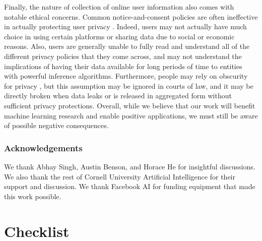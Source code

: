 \documentclass{article}
\begin{document}
Finally, the nature of collection of online user information also comes with notable ethical concerns. Common notice-and-consent policies are often ineffective in actually protecting user privacy \cite{Nissenbaum2011ACA}. Indeed, users may not actually have much choice in using certain platforms or sharing data due to social or economic reasons. Also, users are generally unable to fully read and understand all of the different privacy policies that they come across, and may not understand the implications of having their data available for long periods of time to entities with powerful inference algorithms. Furthermore, people may rely on obscurity for privacy \cite{CaseOnlineObscurity}, but this assumption may be ignored in courts of law, and it may be directly broken when data leaks or is released in aggregated form without sufficient privacy protections. Overall, while we believe that our work will benefit machine learning research and enable positive applications, we must still be aware of possible negative consequences.


\subsubsection*{Acknowledgements}

We thank Abhay Singh, Austin Benson, and Horace He for insightful discussions.
We also thank the rest of Cornell University Artificial Intelligence
for their support and discussion. We thank Facebook AI for funding equipment that made this work possible. 






\section*{Checklist}
\end{document}
